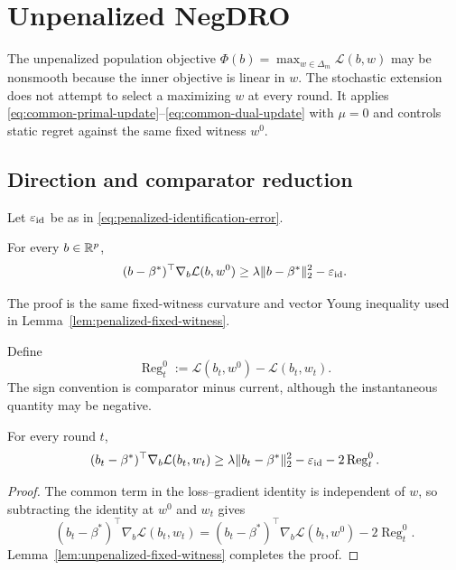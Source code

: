 \section{Unpenalized NegDRO}
\label{sec:unpenalized}

The unpenalized population objective
$\Phi(b)=\max_{w\in\Delta_m}\mathcal L(b,w)$ may be nonsmooth because the
inner objective is linear in $w$.  The stochastic extension does not attempt
to select a maximizing $w$ at every round.  It applies
\eqref{eq:common-primal-update}--\eqref{eq:common-dual-update} with $\mu=0$
and controls static regret against the same fixed witness $w^0$.

\subsection{Direction and comparator reduction}

Let $\varepsilon_{\rm id}$ be as in
\eqref{eq:penalized-identification-error}.
\begin{lemma}
\label{lem:unpenalized-fixed-witness}
For every $b\in\mathbb{R}^p$,
\begin{equation}
  (b-\beta^*)^\top\nabla_b\mathcal L(b,w^0)
  \ge
  \lambda\|b-\beta^*\|_2^2-\varepsilon_{\rm id}.
  \label{eq:unpenalized-fixed-witness-rsi}
\end{equation}
\end{lemma}
The proof is the same fixed-witness curvature and vector Young inequality used
in Lemma~\ref{lem:penalized-fixed-witness}.

Define
\begin{equation}
  \operatorname{Reg}_t^0
  :=\mathcal L(b_t,w^0)-\mathcal L(b_t,w_t).
  \label{eq:unpenalized-comparator-regret}
\end{equation}
The sign convention is comparator minus current, although the instantaneous
quantity may be negative.

\begin{lemma}
\label{lem:unpenalized-comparator-reduction}
For every round $t$,
\begin{equation}
  (b_t-\beta^*)^\top\nabla_b\mathcal L(b_t,w_t)
  \ge
  \lambda\|b_t-\beta^*\|_2^2
  -\varepsilon_{\rm id}-2\operatorname{Reg}_t^0.
  \label{eq:unpenalized-comparator-direction}
\end{equation}
\end{lemma}

\begin{proof}
The common term in the loss--gradient identity is independent of $w$, so
subtracting the identity at $w^0$ and $w_t$ gives
\[
  (b_t-\beta^*)^\top\nabla_b\mathcal L(b_t,w_t)
  =(b_t-\beta^*)^\top\nabla_b\mathcal L(b_t,w^0)
   -2\operatorname{Reg}_t^0.
\]
Lemma~\ref{lem:unpenalized-fixed-witness} completes the proof.
\end{proof}

